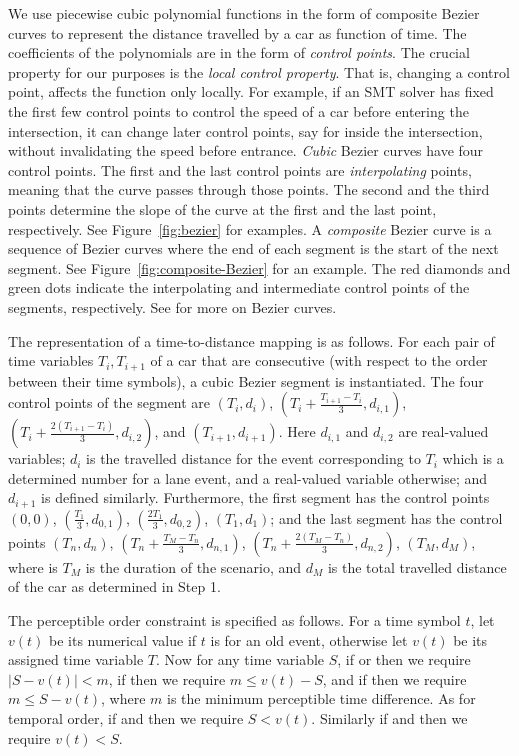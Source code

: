 We use piecewise cubic polynomial functions in the form of composite Bezier curves to represent the distance travelled by a car as function of time.
%
The coefficients of the polynomials are in the form of \emph{control points}.
%
The crucial property for our purposes is the \emph{local control property}.
%
That is, changing a control point, affects the function only locally.
%
For example, if an SMT solver has fixed the first few control points to control the speed of a car before entering the intersection, it can change later control points, say for inside the intersection, without invalidating the speed before entrance.
%
\emph{Cubic} Bezier curves have four control points.
%
The first and the last control points are \emph{interpolating} points, meaning that the curve passes through those points.
%
The second and the third points determine the slope of the curve at the first and the last point, respectively.
%
See Figure~\ref{fig:bezier} for examples.
%
A \emph{composite} Bezier curve is a sequence of Bezier curves where the end of each segment is the start of the next segment.
%
See Figure~\ref{fig:composite-Bezier} for an example.
%
The red diamonds and green dots indicate the interpolating and intermediate control points of the segments, respectively.
%
See \cite{Farin.2002} for more on Bezier curves.


The representation of a time-to-distance mapping is as follows.
%
For each pair of time variables $T_i, T_{i+1}$ of a car that are consecutive (with respect to the  order between their time symbols), a cubic Bezier segment is instantiated.
%
The four control points of the segment are $(T_i, d_i)$, $(T_i + \frac{T_{i+1}-T_i}{3}, d_{i,1})$, $(T_i + \frac{2(T_{i+1}-T_i)}{3}, d_{i,2})$, and $(T_{i+1}, d_{i+1})$.
%
Here $d_{i,1}$ and $d_{i,2}$ are real-valued variables;
$d_i$ is the travelled distance for the event corresponding to $T_i$ which is a determined number for a lane event, and a real-valued variable otherwise; and $d_{i+1}$ is defined similarly.
%
Furthermore, the first segment has the control points $(0, 0)$, $(\frac{T_1}{3}, d_{0,1})$, $(\frac{2T_1}{3}, d_{0,2})$, $(T_1, d_1)$; and the last segment has the control points $(T_n, d_n)$, $(T_n + \frac{T_M-T_n}{3}, d_{n,1})$, $(T_n + \frac{2(T_M-T_n)}{3}, d_{n,2})$, $(T_M, d_M)$, where is $T_M$ is the duration of the scenario, and $d_M$ is the total travelled distance of the car as determined in Step 1.


The perceptible order constraint is specified as follows.
%
For a time symbol $t$, let $v(t)$ be its numerical value if $t$ is for an old event, otherwise let $v(t)$ be its assigned time variable $T$.
%
Now for any time variable $S$, if  or  then we require $|S-v(t)| < m$, if  then we require $m \leq v(t)-S$, and if  then we require $m \leq S-v(t)$, where $m$ is the minimum perceptible time difference.
%
As for temporal order, if  and  then we require $S < v(t)$.
%
Similarly if  and  then we require $v(t) < S$.

